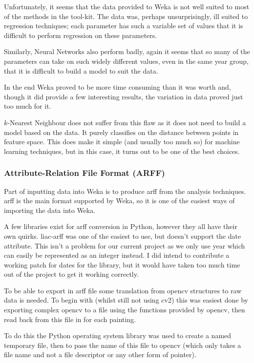 Unfortunately, it seems that the data provided to Weka is not well suited to most of the methods 
in the tool-kit. The data was, perhaps unsurprisingly, ill suited to regression techniques; each
parameter has such a variable set of values that it is difficult to perform regression on these
parameters.

Similarly, Neural Networks also perform badly, again it seems that so many of the parameters can
take on such widely different values, even in the same year group, that it is difficult to build
a model to suit the data.

In the end Weka proved to be more time consuming than it was worth and, though it did provide a 
few interesting results, the variation in data proved just too much for it.

$k$-Nearest Neighbour does not suffer from this flaw as it does not need to build a model based on
the data. It purely classifies on the distance between points in feature space. This does make it
simple (and usually too much so) for machine learning techniques, but in this case, it turns out to 
be one of the best choices.


\subsubsection{Attribute-Relation File Format (ARFF)}
Part of inputting data into Weka is to produce \gls{arff} from the
analysis techniques. \gls{arff} is the main format supported by Weka, so it is one of the easiest ways
of importing the data into Weka.

A few libraries exist for \gls{arff} conversion in Python, however they all have their own quirks. 
liac-arff was one of the easiest to use, but doesn't support the date attribute. This isn't
a problem for our current project as we only use year which can easily be represented as an 
integer instead. I did intend to contribute a working patch for dates for the library, but it 
would have taken too much time out of the project to get it working correctly.

To be able to export in \gls{arff} file some translation from \gls{opencv} structures to raw data is 
needed. To begin with (whilst still not using \gls{cv2}) this was easiest done by exporting 
complex \gls{opencv} to a file using the functions provided by \gls{opencv}, then read back from
this file in for each painting.

To do this the Python operating system library was used to create a named temporary file, then to
pass the name of this file to \gls{opencv} (which only takes a file name and not a file descriptor
or any other form of pointer). 

